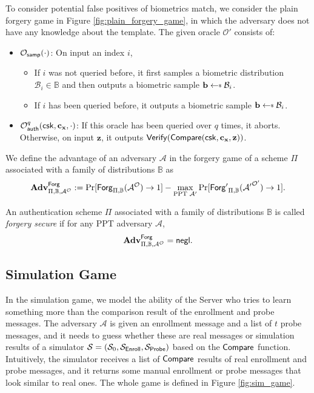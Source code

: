 To consider potential false positives of biometrics match, we consider the plain forgery game in Figure \ref{fig:plain_forgery_game}, in which the adversary does not have any knowledge about the template. The given oracle $\mathcal{O'}$ consists of:
\begin{itemize}
	\item $\mathcal{O}_{\sf samp}(\cdot)$: On input an index $i$,
	\begin{itemize}
		\item If $i$ was not queried before, it first samples a biometric distribution $\mathcal{B}_i \in \mathbb{B}$ and then outputs a biometric sample $\mathbf{b} \getsdollar \mathcal{B}_i$.
		\item If $i$ has been queried before, it outputs a biometric sample $\mathbf{b} \getsdollar \mathcal{B}_i$.
	\end{itemize}
	
	\item $\mathcal{O}_{\sf auth}^{q}({\sf csk}, \mathbf{c_x}, \cdot)$: If this oracle has been queried over $q$ times, it aborts. Otherwise, on input $\mathbf{z}$, it outputs ${\sf Verify}({\sf Compare}({\sf csk}, \mathbf{c_x}, \mathbf{z}))$.
\end{itemize}


We define the advantage of an adversary $\mathcal{A}$ in the forgery game of a scheme $\Pi$ associated with a family of distributions $\mathbb{B}$ as
\[
	\mathbf{Adv}^{\sf Forg}_{\Pi, \mathbb{B}, \mathcal{A}^\mathcal{O}} := \Pr[{\sf Forg}_{\Pi, \mathbb{B}}(\mathcal{A}^\mathcal{O}) \to 1] -
	\max_{\text{PPT } \mathcal{A'}} \Pr[{\sf Forg'}_{\Pi, \mathbb{B}}(\mathcal{A'}^\mathcal{O'}) \to 1].
\]

An authentication scheme $\Pi$ associated with a family of distributions $\mathbb{B}$ is called \emph{forgery secure} if for any PPT adversary $\mathcal{A}$,
\[
	\mathbf{Adv}^{\sf Forg}_{\Pi, \mathbb{B}, \mathcal{A^\mathcal{O}}} = \mathsf{negl}.
\]


\subsection{Simulation Game}
\label{sec:simulation_game}

In the simulation game, we model the ability of the {\sf Server} who tries to learn something more than the comparison result of the enrollment and probe messages. The adversary $\mathcal{A}$ is given an enrollment message and a list of $t$ probe messages, and it needs to guess whether these are real messages or simulation results of a simulator $\mathcal{S} = (\mathcal{S}_0, \mathcal{S}_{\sf Enroll}, \mathcal{S}_{\sf Probe})$ based on the $\sf Compare$ function. Intuitively, the simulator receives a list of $\sf Compare$ results of real enrollment and probe messages, and it returns some manual enrollment or probe messages that look similar to real ones. The whole game is defined in Figure \ref{fig:sim_game}.

